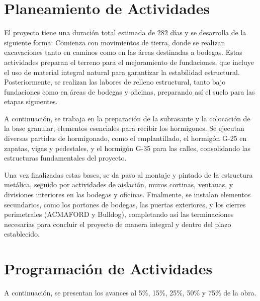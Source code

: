 \documentclass{article} %
\begin{document}
\newpage

\section{Planeamiento de Actividades}

El proyecto tiene una duración total estimada de 282 días y se desarrolla de la siguiente forma: Comienza con movimientos de tierra, donde se realizan excavaciones tanto en caminos como en las áreas destinadas a bodegas. Estas actividades preparan el terreno para el mejoramiento de fundaciones, que incluye el uso de material integral natural para garantizar la estabilidad estructural. Posteriormente, se realizan las labores de relleno estructural, tanto bajo fundaciones como en áreas de bodegas y oficinas, preparando así el suelo para las etapas siguientes.

A continuación, se trabaja en la preparación de la subrasante y la colocación de la base granular, elementos esenciales para recibir los hormigones. Se ejecutan diversas partidas de hormigonado, como el emplantillado, el hormigón G-25 en zapatas, vigas y pedestales, y el hormigón G-35 para las calles, consolidando las estructuras fundamentales del proyecto. 

Una vez finalizadas estas bases, se da paso al montaje y pintado de la estructura metálica, seguido por actividades de aislación, muros cortinas, ventanas, y divisiones interiores en las bodegas y oficinas. Finalmente, se instalan elementos secundarios, como los portones de bodegas, las puertas exteriores, y los cierres perimetrales (ACMAFORD y Bulldog), completando así las terminaciones necesarias para concluir el proyecto de manera integral y dentro del plazo establecido.

\newpage

\section{Programación de Actividades}

A continuación, se presentan los avances al 5\%, 15\%, 25\%, 50\% y 75\% de la obra.
\end{document}
